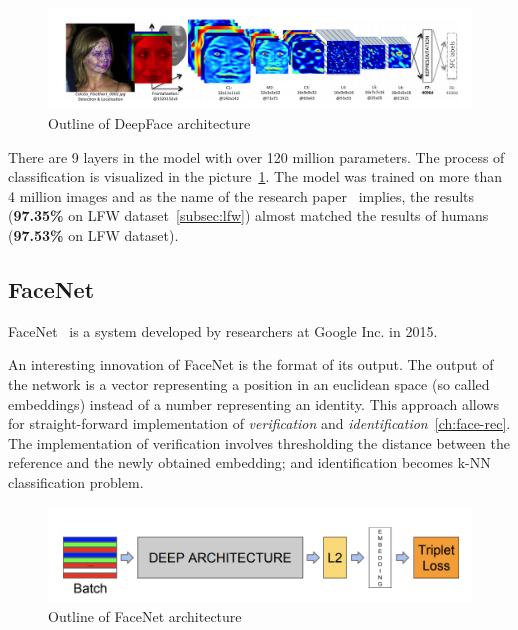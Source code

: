 \begin{figure}[H]
    \centering
    \includegraphics[width=\columnwidth]{images/face-recognition/deepface.png}
    \caption{Outline of DeepFace architecture~\cite{DeepFace}}
    \label{fig:deepface}
\end{figure}

There are 9 layers in the model with over 120 million parameters.
The process of classification is visualized in the picture~\ref{fig:deepface}.
The model was trained on more than 4 million images and as the name of the research paper~\cite{DeepFace} implies,
the results (\textbf{97.35\%} on LFW dataset~\ref{subsec:lfw}) almost matched the results of humans (\textbf{97.53\%}
on LFW dataset).


\subsection{FaceNet}\label{subsec:facenet}
FaceNet~\cite{FaceNet} is a system developed by researchers at Google Inc. in 2015.

An interesting innovation of FaceNet is the format of its output.
The output of the network is a vector representing a position in an euclidean space (so called embeddings) instead of a
number representing an identity.
This approach allows for straight-forward implementation of \textit{verification} and
\textit{identification}~\ref{ch:face-rec}.
The implementation of verification involves thresholding the distance between the reference and the newly obtained
embedding; and identification becomes k-NN classification problem.

\begin{figure}[H]
    \centering
    \includegraphics[width=\columnwidth]{images/face-recognition/facenet.png}
    \caption{Outline of FaceNet architecture~\cite{FaceNet}}
    \label{fig:facenet}
\end{figure}

